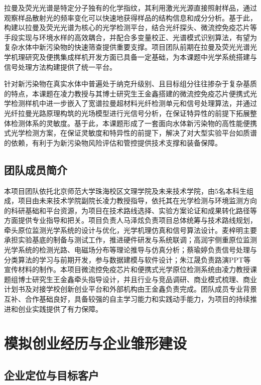 \documentclass[12pt,a4paper]{article}
\begin{document}
拉曼及荧光光谱是特定分子独有的化学指纹，其利用激光光源直接照射样品，通过观察样品散射光的频率变化可以快速地获得样品的结构信息和成分分析\cite{ref11,ref15,ref16}。基于此，构建以拉曼及荧光光谱为核心的光学检测平台，结合光纤探头、微流控免疫芯片等手段实现与环境水样的高效耦合，并配合多变量校正、光谱模式识别算法，有望为复杂水体中新污染物的快速筛查提供重要支撑。项目团队前期在拉曼及荧光光谱光学机理研究及便携集成样机开发方面已具备一定基础，为本课题中光学系统搭建与信号处理方法构建提供了统一平台。

针对新污染物在真实水体中普遍处于纳克升级别、且目标组分往往掺杂于复杂基质的特点，本课题在凌力教授与其博士研究生王金鑫搭建的微流控免疫芯片便携式光学检测样机中进一步嵌入了宽谱拉曼超材料光纤检测单元和信号处理算法，并通过光纤拉曼光路原理构筑的光场模型进行光信号分析，在保证特异性的前提下拓展整体检测体系的灵敏度。基于此，本课题形成了一套面向水体新污染物的高性能便携式光学检测方案，在保证灵敏度和特异性的前提下，解决了对大型实验平台如质谱的依赖，有利于为新污染物风险评估和管控提供技术支撑和装备保障。

\subsection{团队成员简介}

本项目团队依托北京师范大学珠海校区文理学院及未来技术学院，由5名本科生组成，项目由未来技术学院副院长凌力教授指导，依托其在光学检测与环境监测方向的科研基础和平台资源，为项目在技术路线选择、实验方案论证和成果转化路径等方面提供专业指导和把关。项目负责人马泽炫负责项目总体统筹与技术路线规划，牵头原位监测光学系统的设计与优化，光学机理仿真和信号算法设计。麦梓明主要承担实验基底的制备与测试工作，推进硬件研发与系统联调；高润宇侧重原位监测光学系统的检测光路、电磁场分布等理论推导与仿真分析；蔡瑜婷负责信号处理与分类算法的学习与前期开发，参与数据建模与软件设计；朱江晟负责路演PPT等宣传材料的制作。本项目微流控免疫芯片和便携式光学原位检测系统由凌力教授课题组博士研究生王金鑫牵头指导设计，并且行业与竞品调研、商业模式梳理、商业计划书及对接学校创新创业平台和外部机构由王金鑫负责完成。团队成员专业背景互补、合作基础良好，具备较强的自主学习能力和实践动手能力，为项目的持续推进和创业实践提供了有力保障。

\section{模拟创业经历与企业雏形建设}

\subsection{企业定位与目标客户}
\end{document}
